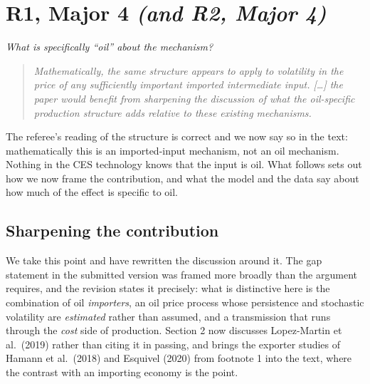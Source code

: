 
\section*{R1, Major 4 \textnormal{\itshape (and R2, Major 4)}}
{\itshape What is specifically ``oil'' about the mechanism?}

\begin{quote}\itshape
Mathematically, the same structure appears to apply to volatility in the price of
any sufficiently important imported intermediate input. [\ldots] the paper would
benefit from sharpening the discussion of what the oil-specific production
structure adds relative to these existing mechanisms.
\end{quote}

The referee's reading of the structure is correct and we now say so in the text:
mathematically this is an imported-input mechanism, not an oil mechanism. Nothing
in the CES technology knows that the input is oil. What follows sets out how we now
frame the contribution, and what the model and the data say about how much of the
effect is specific to oil.

\subsection*{Sharpening the contribution}

We take this point and have rewritten the discussion around it. The gap
statement in the submitted version was framed more broadly than the argument
requires, and the revision states it precisely: what is distinctive here is the
combination of oil \emph{importers}, an oil price process whose persistence and
stochastic volatility are \emph{estimated} rather than assumed, and a
transmission that runs through the \emph{cost} side of production. Section 2 now
discusses Lopez-Martin et al.\ (2019) rather than citing it in passing, and
brings the exporter studies of Hamann et al.\ (2018) and Esquivel (2020) from
footnote 1 into the text, where the contrast with an importing economy is the
point.

